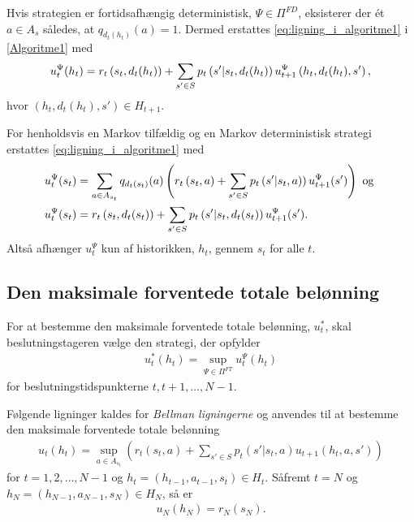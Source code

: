 Hvis strategien er fortidsafhængig deterministisk, $\Psi\in \Pi^{FD}$, eksisterer der ét $a\in A_s$ således, at $q_{d_t(h_t)}(a)=1$. Dermed erstattes \eqref{eq:ligning_i_algoritme1} i \autoref{Algoritme1} med 
\begin{align}\label{eq:uPsi_for_FD}
        \vspace{-0.5cm}u_t^\Psi(h_t) = r_t\left(s_t, d_t(h_t)\right) + \sum_{s' \in S} p_t\left(s'|s_t,d_t(h_t)\right)u_{t+1}^\Psi\left(h_t,d_t(h_t),s'\right),
    \end{align}
hvor $\left(h_t, d_t(h_t), s'\right) \in H_{t+1}$.
 
For henholdsvis en Markov tilfældig og en Markov deterministisk strategi erstattes \eqref{eq:ligning_i_algoritme1} med 
\begin{align*}
        \vspace{-0.5cm}u_t^\Psi(s_t) &=\sum_{a \in A_{s_t}}q_{d_t(s_t)}(a)\left( r_t\left(s_t, a\right) + \sum_{s' \in S} p_t\left(s'|s_t,a)\right)u_{t+1}^\Psi(s')\right) \text{ og }\\
        \vspace{-0.5cm}u_t^\Psi(s_t) &= r_t\left(s_t, d_t(s_t)\right) + \sum_{s' \in S} p_t\left(s'|s_t,d_t(s_t)\right)u_{t+1}^\Psi(s').
\end{align*}
Altså afhænger $u_t^\Psi$ kun af historikken, $h_t$, gennem $s_t$ for alle $t$.

\subsection{Den maksimale forventede totale belønning}
For at bestemme den maksimale forventede totale belønning, $u_t^*$, skal beslutningstageren vælge den strategi, der opfylder
\begin{align}\label{eq:u*}
    u_t^*(h_t)=\sup_{\Psi\in\Pi^{FT}}u_t^\Psi(h_t)
\end{align}
for beslutningstidspunkterne $t, t+1,\ldots, N-1$. 

Følgende ligninger kaldes for \textit{Bellman ligningerne} og anvendes til at bestemme den maksimale forventede totale belønning
\begin{align}\label{eq:u_t_sup}
   u_t(h_t)=\sup_{a\in A_{s_t}}\left(r_t(s_t, a)+\sum_{s'\in S}p_t(s'|s_t, a)u_{t+1}(h_t, a, s')\right)
\end{align}
for $t=1, 2, \ldots, N-1$ og $h_t=(h_{t-1}, a_{t-1}, s_t)\in H_t$.
Såfremt $t= N$ og $h_N = (h_{N-1}, a_{N-1}, s_N) \in H_N$, så er 
\begin{align}\label{eq:u_N}
    u_N(h_N) = r_N(s_N). 
\end{align}

